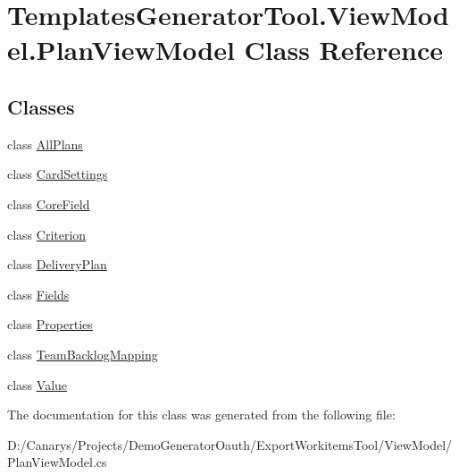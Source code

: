 \hypertarget{class_templates_generator_tool_1_1_view_model_1_1_plan_view_model}{}\section{Templates\+Generator\+Tool.\+View\+Model.\+Plan\+View\+Model Class Reference}
\label{class_templates_generator_tool_1_1_view_model_1_1_plan_view_model}
\subsection*{Classes}
\begin{DoxyCompactItemize}
\item 
class \mbox{\hyperlink{class_templates_generator_tool_1_1_view_model_1_1_plan_view_model_1_1_all_plans}{All\+Plans}}
\item 
class \mbox{\hyperlink{class_templates_generator_tool_1_1_view_model_1_1_plan_view_model_1_1_card_settings}{Card\+Settings}}
\item 
class \mbox{\hyperlink{class_templates_generator_tool_1_1_view_model_1_1_plan_view_model_1_1_core_field}{Core\+Field}}
\item 
class \mbox{\hyperlink{class_templates_generator_tool_1_1_view_model_1_1_plan_view_model_1_1_criterion}{Criterion}}
\item 
class \mbox{\hyperlink{class_templates_generator_tool_1_1_view_model_1_1_plan_view_model_1_1_delivery_plan}{Delivery\+Plan}}
\item 
class \mbox{\hyperlink{class_templates_generator_tool_1_1_view_model_1_1_plan_view_model_1_1_fields}{Fields}}
\item 
class \mbox{\hyperlink{class_templates_generator_tool_1_1_view_model_1_1_plan_view_model_1_1_properties}{Properties}}
\item 
class \mbox{\hyperlink{class_templates_generator_tool_1_1_view_model_1_1_plan_view_model_1_1_team_backlog_mapping}{Team\+Backlog\+Mapping}}
\item 
class \mbox{\hyperlink{class_templates_generator_tool_1_1_view_model_1_1_plan_view_model_1_1_value}{Value}}
\end{DoxyCompactItemize}


The documentation for this class was generated from the following file\+:\begin{DoxyCompactItemize}
\item 
D\+:/\+Canarys/\+Projects/\+Demo\+Generator\+Oauth/\+Export\+Workitems\+Tool/\+View\+Model/Plan\+View\+Model.\+cs\end{DoxyCompactItemize}
